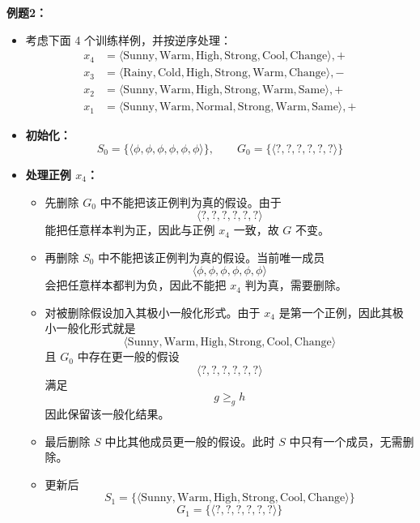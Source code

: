 \documentclass[../main.tex]{subfiles}
\begin{document}
\begin{enumerate}
\textbf{例题2：}\label{houxuan2}

{\small\kaishu
\begin{itemize}
    \item 考虑下面 4 个训练样例，并按逆序处理：
    \[
    \begin{aligned}
        x_4 &= \langle \text{Sunny}, \text{Warm}, \text{High}, \text{Strong}, \text{Cool}, \text{Change} \rangle, + \\
        x_3 &= \langle \text{Rainy}, \text{Cold}, \text{High}, \text{Strong}, \text{Warm}, \text{Change} \rangle, - \\
        x_2 &= \langle \text{Sunny}, \text{Warm}, \text{High}, \text{Strong}, \text{Warm}, \text{Same} \rangle, + \\
        x_1 &= \langle \text{Sunny}, \text{Warm}, \text{Normal}, \text{Strong}, \text{Warm}, \text{Same} \rangle, +
    \end{aligned}
    \]

    \item \textbf{初始化：}
    \[
        S_0=\{\langle \phi,\phi,\phi,\phi,\phi,\phi \rangle\},\qquad
        G_0=\{\langle ?, ?, ?, ?, ?, ? \rangle\}
    \]

    \item \textbf{处理正例 $x_4$：}
    \begin{itemize}
        \item 先删除 $G_0$ 中不能把该正例判为真的假设。由于
        \[
            \langle ?, ?, ?, ?, ?, ? \rangle
        \]
        能把任意样本判为正，因此与正例 $x_4$ 一致，故 $G$ 不变。
        \item 再删除 $S_0$ 中不能把该正例判为真的假设。当前唯一成员
        \[
            \langle \phi,\phi,\phi,\phi,\phi,\phi \rangle
        \]
        会把任意样本都判为负，因此不能把 $x_4$ 判为真，需要删除。
        \item 对被删除假设加入其极小一般化形式。由于 $x_4$ 是第一个正例，因此其极小一般化形式就是
        \[
            \langle \text{Sunny}, \text{Warm}, \text{High}, \text{Strong}, \text{Cool}, \text{Change} \rangle
        \]
        且 $G_0$ 中存在更一般的假设
        \[
            \langle ?, ?, ?, ?, ?, ? \rangle
        \]
        满足
        \[
            g \geq_g h
        \]
        因此保留该一般化结果。
        \item 最后删除 $S$ 中比其他成员更一般的假设。此时 $S$ 中只有一个成员，无需删除。
        \item 更新后
        \[
            S_1=\{\langle \text{Sunny}, \text{Warm}, \text{High}, \text{Strong}, \text{Cool}, \text{Change} \rangle\}
        \]
        \[
            G_1=\{\langle ?, ?, ?, ?, ?, ? \rangle\}
        \]
    \end{itemize}


\end{itemize}}
\end{enumerate}
\end{document}
